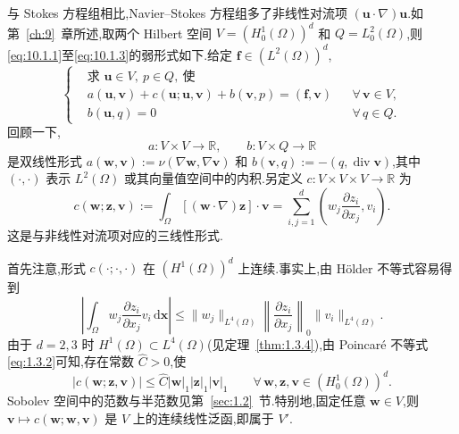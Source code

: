 与 Stokes 方程组相比,Navier--Stokes 方程组多了非线性对流项 \((\boldsymbol{u}\cdot\nabla)\boldsymbol{u}\).如第~\ref{ch:9}~章所述,取两个 Hilbert 空间 \(V=(H_0^1(\Omega))^d\) 和 \(Q=L_0^2(\Omega)\),则\eqref{eq:10.1.1}至\eqref{eq:10.1.3}的弱形式如下.给定 \(\boldsymbol{f}\in(L^2(\Omega))^d\),
\begin{equation}\label{eq:10.1.4}
  \left\{
  \begin{aligned}
    &\text{求 }\boldsymbol{u}\in V,\ p\in Q,\ \text{使}\\
    &a(\boldsymbol{u},\boldsymbol{v})+c(\boldsymbol{u};\boldsymbol{u},\boldsymbol{v})+b(\boldsymbol{v},p)
       =(\boldsymbol{f},\boldsymbol{v})&&\forall\,\boldsymbol{v}\in V,\\
    &b(\boldsymbol{u},q)=0&&\forall\,q\in Q .
  \end{aligned}
  \right.
\end{equation}
回顾一下,
\[
  a\colon V\times V\to\mathbb R,\qquad b\colon V\times Q\to\mathbb R
\]
是双线性形式 \(a(\boldsymbol{w},\boldsymbol{v}):=\nu(\nabla\boldsymbol{w},\nabla\boldsymbol{v})\) 和 \(b(\boldsymbol{v},q):=-(q,\operatorname{div}\boldsymbol{v})\),其中 \((\cdot,\cdot)\) 表示 \(L^2(\Omega)\) 或其向量值空间中的内积.另定义 \(c\colon V\times V\times V\to\mathbb R\) 为
\begin{equation}\label{eq:10.1.5}
  c(\boldsymbol{w};\boldsymbol{z},\boldsymbol{v}):=
      \int_\Omega[(\boldsymbol{w}\cdot\nabla)\boldsymbol{z}]\cdot\boldsymbol{v}
      =\sum_{i,j=1}^d\left(w_j\frac{\partial z_i}{\partial x_j},v_i\right).
\end{equation}
这是与非线性对流项对应的三线性形式.

首先注意,形式 \(c(\cdot;\cdot,\cdot)\) 在 \((H^1(\Omega))^d\) 上连续.事实上,由 Hölder 不等式容易得到
\[
  \left|\int_\Omega w_j\frac{\partial z_i}{\partial x_j}v_i\,\mathrm d\boldsymbol{x}\right|
      \le\|w_j\|_{L^4(\Omega)}
          \left\|\frac{\partial z_i}{\partial x_j}\right\|_0
          \|v_i\|_{L^4(\Omega)}.
\]
由于 \(d=2,3\) 时 \(H^1(\Omega)\subset L^4(\Omega)\)(见定理~\ref{thm:1.3.4}),由 Poincaré 不等式\eqref{eq:1.3.2}可知,存在常数 \(\widehat C>0\),使
\begin{equation}\label{eq:10.1.6}
  |c(\boldsymbol{w};\boldsymbol{z},\boldsymbol{v})|
      \le\widehat C|\boldsymbol{w}|_1|\boldsymbol{z}|_1|\boldsymbol{v}|_1
      \qquad\forall\,\boldsymbol{w},\boldsymbol{z},\boldsymbol{v}\in(H_0^1(\Omega))^d.
\end{equation}
Sobolev 空间中的范数与半范数见第~\ref{sec:1.2}~节.特别地,固定任意 \(\boldsymbol{w}\in V\),则 \(\boldsymbol{v}\mapsto c(\boldsymbol{w};\boldsymbol{w},\boldsymbol{v})\) 是 \(V\) 上的连续线性泛函,即属于 \(V'\).

